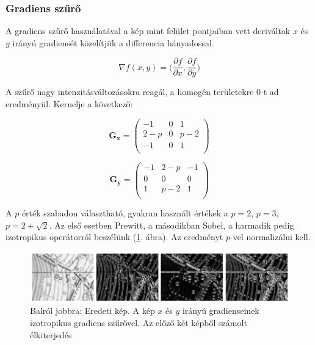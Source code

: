 \documentclass[a4paper,12pt]{article}
\begin{document}
\subsubsection{Gradiens szűrő}

A gradiens szűrő használatával a kép mint felület pontjaiban vett deriváltak $x$
és $y$ irányú gradiensét közelítjük a differencia hányadossal. 

$$\nabla f(x,y)= \Big(\frac{\partial f}{\partial x}, \frac{\partial f}{\partial
	y}\Big)$$ 

A szűrő nagy intenzitásváltozásokra reagál, a homogén területekre 0-t ad
eredményül. Kernelje a következő:

\begin{displaymath}
\mathbf{G_x}=\left(
\begin{array}{ccc}
-1 & 0 & 1\\
2-p & 0 & p-2 \\
-1 & 0 & 1 \\
\end{array}
\right)
\end{displaymath}


\begin{displaymath}
\mathbf{G_y}=\left(
\begin{array}{ccc}
-1 & 2-p & -1\\
0 & 0 & 0 \\
1 & p-2 & 1 \\
\end{array}
\right)
\end{displaymath}


A $p$ érték szabadon választható, gyakran használt értékek a $p=2$, $p=3$,
$p=2+\sqrt{2}$. Az első esetben Prewitt, a másodikban Sobel, a harmadik pedig
izotropikus operátorról beszélünk (\ref{fig:gradiens_szurok}. ábra). Az
eredményt $p$-vel normalizálni kell.


\begin{figure}
	\centering
	\includegraphics[width=14cm]{gradiens_szurok.png}
	\caption{Balról jobbra: Eredeti kép. A kép $x$ és $y$ irányú gradienseinek izotropikus gradiens szűrővel. Az előző két képből számolt élkiterjedés}
	\label{fig:gradiens_szurok}
\end{figure}
\end{document}
